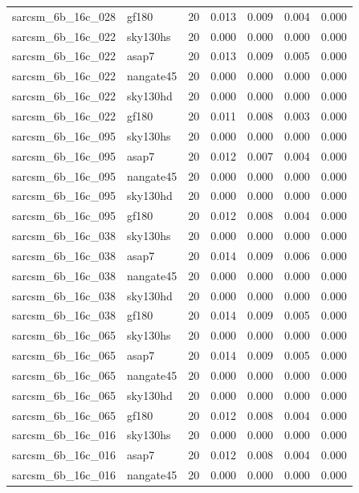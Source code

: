 \begin{tabular}{llrrrrr}
sarcsm\_6b\_16c\_028 & gf180 & 20 & 0.013 & 0.009 & 0.004 & 0.000 \\
sarcsm\_6b\_16c\_022 & sky130hs & 20 & 0.000 & 0.000 & 0.000 & 0.000 \\
sarcsm\_6b\_16c\_022 & asap7 & 20 & 0.013 & 0.009 & 0.005 & 0.000 \\
sarcsm\_6b\_16c\_022 & nangate45 & 20 & 0.000 & 0.000 & 0.000 & 0.000 \\
sarcsm\_6b\_16c\_022 & sky130hd & 20 & 0.000 & 0.000 & 0.000 & 0.000 \\
sarcsm\_6b\_16c\_022 & gf180 & 20 & 0.011 & 0.008 & 0.003 & 0.000 \\
sarcsm\_6b\_16c\_095 & sky130hs & 20 & 0.000 & 0.000 & 0.000 & 0.000 \\
sarcsm\_6b\_16c\_095 & asap7 & 20 & 0.012 & 0.007 & 0.004 & 0.000 \\
sarcsm\_6b\_16c\_095 & nangate45 & 20 & 0.000 & 0.000 & 0.000 & 0.000 \\
sarcsm\_6b\_16c\_095 & sky130hd & 20 & 0.000 & 0.000 & 0.000 & 0.000 \\
sarcsm\_6b\_16c\_095 & gf180 & 20 & 0.012 & 0.008 & 0.004 & 0.000 \\
sarcsm\_6b\_16c\_038 & sky130hs & 20 & 0.000 & 0.000 & 0.000 & 0.000 \\
sarcsm\_6b\_16c\_038 & asap7 & 20 & 0.014 & 0.009 & 0.006 & 0.000 \\
sarcsm\_6b\_16c\_038 & nangate45 & 20 & 0.000 & 0.000 & 0.000 & 0.000 \\
sarcsm\_6b\_16c\_038 & sky130hd & 20 & 0.000 & 0.000 & 0.000 & 0.000 \\
sarcsm\_6b\_16c\_038 & gf180 & 20 & 0.014 & 0.009 & 0.005 & 0.000 \\
sarcsm\_6b\_16c\_065 & sky130hs & 20 & 0.000 & 0.000 & 0.000 & 0.000 \\
sarcsm\_6b\_16c\_065 & asap7 & 20 & 0.014 & 0.009 & 0.005 & 0.000 \\
sarcsm\_6b\_16c\_065 & nangate45 & 20 & 0.000 & 0.000 & 0.000 & 0.000 \\
sarcsm\_6b\_16c\_065 & sky130hd & 20 & 0.000 & 0.000 & 0.000 & 0.000 \\
sarcsm\_6b\_16c\_065 & gf180 & 20 & 0.012 & 0.008 & 0.004 & 0.000 \\
sarcsm\_6b\_16c\_016 & sky130hs & 20 & 0.000 & 0.000 & 0.000 & 0.000 \\
sarcsm\_6b\_16c\_016 & asap7 & 20 & 0.012 & 0.008 & 0.004 & 0.000 \\
sarcsm\_6b\_16c\_016 & nangate45 & 20 & 0.000 & 0.000 & 0.000 & 0.000 \\

\end{tabular}
